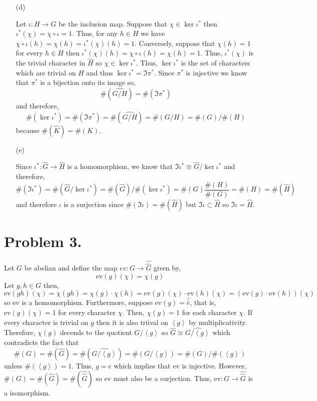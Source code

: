 \documentclass[12pt]{extarticle}
\begin{document}
\begin{enumerate}
\item[(d)]

Let $\iota : H \to G$ be the inclusion map. Suppose that $\chi \in \ker{\iota^*}$ then $\iota^* (\chi) = \chi \circ \iota = 1$. Thus, for any $h\in H$ we have $\chi \circ \iota(h) = \chi(h) = \iota^*(\chi)(h) = 1$. Conversely, suppose that $\chi(h) = 1$ for every $h \in H$ then $\iota^*(\chi)(h) = \chi \circ \iota(h) = \chi(h) = 1$. Thus, $\iota^*(\chi)$ is the trivial character in $\hat{H}$ so $\chi \in \ker{\iota^*}$. Thus, $\ker{\iota^*}$ is the set of characters which are trivial on $H$ and thus $\ker{\iota^*} = \Im{\pi^*}$. Since $\pi^*$ is injective we know that $\pi^*$ is a bijection onto its image so,
\[ \#(\widehat{G/H}) = \#(\Im{\pi^*}) \]
and therefore,
\[\#(\ker{\iota^*}) = \#(\Im{\pi^*}) = \#(\widehat{G/H}) = \#(G/H) = \#(G)/\#(H) \]
because $\#(\hat{K}) = \#(K)$. 

\item[(e)]

Since $\iota^* : \hat{G} \to \hat{H}$ is a homomorphism, we know that $\Im{\iota^*} \cong \hat{G}/\ker{\iota^*}$ and therefore,
\[ \#(\Im{\iota^*}) = \#(\hat{G}/\ker{\iota^*}) = \#(\hat{G})/\#(\ker{\iota^*}) = \#(G) \frac{\#(H)}{\#(G)} = \#(H) = \#(\hat{H}) \] 
and therefore $\iota$ is a surjection since $\#(\Im{\iota}) = \#(\hat{H})$ but $\Im{\iota} \subset \hat{H}$ so $\Im{\iota} = \hat{H}$. 
\end{enumerate}

\section*{Problem 3.}

\newcommand{\ev}{\mathrm{ev}}
Let $G$ be abelian and define the map $ev : G \to \hat{\hat{G}}$ given by,
\[ \ev(g)(\chi) = \chi(g) \]
Let $g, h \in G$ then,
\[ \ev(gh)(\chi) = \chi(gh) = \chi(g) \cdot \chi(h) = \ev(g)(\chi) \cdot \ev(h)(\chi) = (\ev(g) \cdot \ev(h))(\chi) \]
so $\ev$ is a homomorphism. Furthermore, suppose $\ev(g) = \hat{\hat{e}}$, that is, $\ev(g)(\chi) = 1$ for every character $\chi$. Then, $\chi(g) = 1$ for each character $\chi$. If every character is trivial on $g$ then it is also triival on $\left<g \right>$ by multiplicativity. Therefore, $\chi(g)$ decends to the quotient $G / \left< g \right>$ so $\hat{G} \cong \widehat{G/\left<g\right>}$ which contradicts the fact that 
\[\#(G) = \#(\hat{G}) = \#(\widehat{G/\left<g\right>}) = \#(G/\left<g\right>) = \#(G) / \#(\left< g \right>)\]
unless $\#(\left< g \right>) = 1$. 
Thus, $g = e$ which implies that $\ev$ is injective. However, $\#(G) = \#(\hat{G}) = \#(\hat{\hat{G}})$ so $\ev$ must also be a surjection. Thus, $\ev : G \to \hat{\hat{G}}$ is a isomorphism. 
\end{document}
